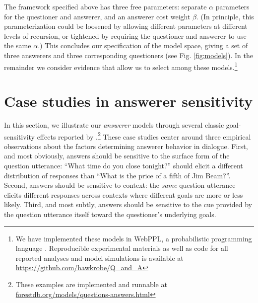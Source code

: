 \documentclass[11pt, floatsintext]{apa6}
\begin{document}
The framework specified above has three free parameters: separate $\alpha$ parameters for the questioner and answerer, and an answerer cost weight $\beta$.
(In principle, this parameterization could be loosened by allowing different parameters at different levels of recursion, or tightened by requiring the questioner and answerer to use the same $\alpha$.)
This concludes our specification of the model space, giving a set of three answerers and three corresponding questioners (see Fig. \ref{fig:models}). In the remainder we consider evidence that allow us to select among these models.\footnote{We have implemented these models in WebPPL, a probabilistic programming language \cite{GoodmanStuhlmuller14_DIPPL}. Reproducible experimental materials as well as code for all reported analyses and model simulations is available at \url{https://github.com/hawkrobe/Q\_and\_A}}
 

%



\section{Case studies in answerer sensitivity}

In this section, we illustrate our \emph{answerer} models through several classic goal-sensitivity effects reported by .\footnote{These examples are implemented and runnable at \url{forestdb.org/models/questions-answers.html}} These case studies center around three empirical observations about the factors determining answerer behavior in dialogue. First, and most obviously, answers should be sensitive to the surface form of the question utterance: ``What time do you close tonight?'' should elicit a different distribution of responses than ``What is the price of a fifth of Jim Beam?''. Second, answers should be sensitive to context: the \emph{same} question utterance elicits different responses across contexts where different goals are more or less likely. Third, and most subtly, answers should be sensitive to the cue provided by the question utterance itself toward the questioner's underlying goals.
\end{document}
